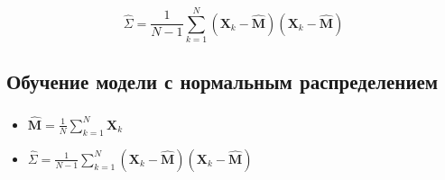 \documentclass{beamer}
\begin{document}
\begin{frame}
  \frametitle{\insertsection}
  \framesubtitle{\insertsubsection}
  \begin{equation*}
    \widehat{\Sigma} = \frac{1}{N - 1} \sum_{k = 1}^N (\mathbf{X}_k - \mathbf{\widehat{M}})(\mathbf{X}_k - \mathbf{\widehat{M}})
  \end{equation*}

\end{frame}

\subsection{Обучение модели с нормальным распределением}

\begin{frame}
  \frametitle{\insertsection}
  \framesubtitle{\insertsubsection}
  \begin{itemize}
  \item $\displaystyle \mathbf{\widehat{M}} = \frac{1}{N} \sum_{k = 1}^{N} \mathbf{X}_k$
  \item $\displaystyle \widehat{\Sigma} = \frac{1}{N - 1} \sum_{k = 1}^N (\mathbf{X}_k - \mathbf{\widehat{M}})(\mathbf{X}_k - \mathbf{\widehat{M}}) $
  \end{itemize}

\end{frame}
\end{document}
